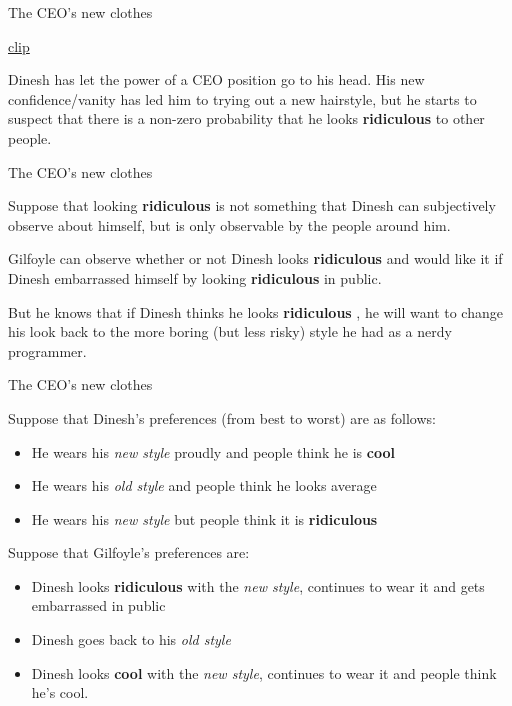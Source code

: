 \begin{frame}{The CEO's new clothes}
  
  \href{https://youtu.be/_1Tn1qqBrhM}{clip}
  
  \alert{Dinesh} has let the power of a CEO position go to his head.
  His new confidence/vanity has led him to trying out a new hairstyle,
  but he starts to suspect that there is a non-zero probability 
  that he looks \textbf{ridiculous} to other people. 

\end{frame}


\begin{frame}{The CEO's new clothes}
  
  Suppose that looking \textbf{ridiculous} is not something that \alert{Dinesh} can 
  subjectively observe about himself, 
  but is only observable by the people around him.
  
  \alert{Gilfoyle} can observe whether or not \alert{Dinesh} looks \textbf{ridiculous}
  and would like it if \alert{Dinesh} embarrassed himself 
  by looking \textbf{ridiculous} in public.

  But he knows that if \alert{Dinesh} thinks he looks \textbf{ridiculous} , 
  he will want to change his look back to the more boring (but less risky)
  style he had as a nerdy programmer. 

\end{frame}


\begin{frame}{The CEO's new clothes}

   Suppose that \alert{Dinesh}'s preferences (from best to worst) are as follows:
  \begin{itemize}
    \item He wears his \textit{new style} proudly and people think he is \textbf{cool}
    \item He wears his \textit{old style} and people think he looks average
    \item He wears his \textit{new style} but people think it is \textbf{ridiculous}
  \end{itemize}
  
  Suppose that \alert{Gilfoyle}'s preferences are:
  \begin{itemize}
    \item \alert{Dinesh} looks \textbf{ridiculous} with the \textit{new style}, 
    continues to wear it and gets embarrassed in public
    \item \alert{Dinesh} goes back to his \textit{old style} 
    \item \alert{Dinesh} looks \textbf{cool} with the \textit{new style},
    continues to wear it and people think he's cool. 
  \end{itemize}
 
\end{frame}

